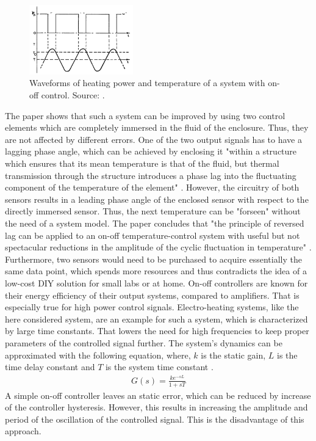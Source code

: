 \begin{figure}[H]
\centering          
\includegraphics[width=0.4\textwidth]{./fig/waveforms} \caption[Waveforms of heating power and temperature of a system with on-off control.]{Waveforms of heating power and temperature of a system with on-off control. Source: \cite{article:revLag}.}   
\label{fig:waveforms}
\end{figure}  

The paper shows that such a system can be improved by using two control elements which are completely immersed in the fluid of the enclosure. Thus, they are not affected by different errors. One of the two output signals has to have a lagging phase angle, which can be achieved by enclosing it "within a structure which ensures that its mean temperature is that of the fluid, but thermal transmission through the structure introduces a phase lag into the fluctuating component of the temperature of the element" \cite{article:revLag}. However, the circuitry of both sensors results in a leading phase angle of the enclosed sensor with respect to the directly immersed sensor. Thus, the next temperature can be "forseen" without the need of a system model. The paper concludes that "the principle of reversed lag can be applied to an on-off temperature-control system with useful but not spectacular reductions in the amplitude of the cyclic fluctuation in temperature" \cite{article:revLag}. Furthermore, two sensors would need to be purchased to acquire essentially the same data point, which spends more resources and thus contradicts the idea of a low-cost \gls{DIY} solution for small labs or at home.
\newpar
On-off controllers are known for their energy efficiency of their output systems, compared to amplifiers. That is especially true for high power control signals. Electro-heating systems, like the here considered system, are an example for such a system, which is characterized by large time constants. That lowers the need for high frequencies to keep proper parameters of the controlled signal further. The system's dynamics can be approximated with the following equation, where, \(k\) is the static gain, \(L\) is the time delay constant and \(T\) is the system time constant \cite{article:onoffPLC}.
\begin{align}
G(s)=\frac{ke^{-sL}}{1+sT}
\end{align}
A simple on-off controller leaves an static error, which can be reduced by increase of the controller hysteresis. However, this results in increasing the amplitude and period of the oscillation of the controlled signal. This is the disadvantage of this approach. 

